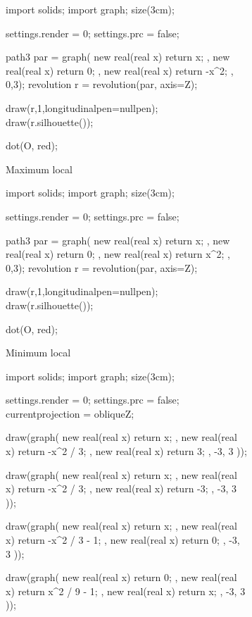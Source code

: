 \begin{figure}[H]
	\centering
	\begin{subfigure}{3cm}
		\centering
		\begin{asy}
			import solids;
			import graph;
			size(3cm);

			settings.render = 0;
			settings.prc = false;

			path3 par = graph(
				new real(real x) { return x; },
				new real(real x) { return 0; },
				new real(real x) { return -x^2; },
				0,3);
			revolution r = revolution(par, axis=Z);

			draw(r,1,longitudinalpen=nullpen);
			draw(r.silhouette());

			dot(O, red);
		\end{asy}
		\caption{Maximum local}
	\end{subfigure}
	\begin{subfigure}{3cm}
		\centering
		\begin{asy}
			import solids;
			import graph;
			size(3cm);

			settings.render = 0;
			settings.prc = false;

			path3 par = graph(
				new real(real x) { return x; },
				new real(real x) { return 0; },
				new real(real x) { return x^2; },
				0,3);
			revolution r = revolution(par, axis=Z);

			draw(r,1,longitudinalpen=nullpen);
			draw(r.silhouette());

			dot(O, red);
		\end{asy}
		\caption{Minimum local}
	\end{subfigure}
	\begin{subfigure}{3cm}
		\centering
		\begin{asy}
			import solids;
			import graph;
			size(3cm);

			settings.render = 0;
			settings.prc = false;
			currentprojection = obliqueZ;

			draw(graph(
				new real(real x) { return x; },
				new real(real x) { return -x^2 / 3; },
				new real(real x) { return 3; },
				-3, 3
			));

			draw(graph(
				new real(real x) { return x; },
				new real(real x) { return -x^2 / 3; },
				new real(real x) { return -3; },
				-3, 3
			));

			draw(graph(
				new real(real x) { return x; },
				new real(real x) { return -x^2 / 3 - 1; },
				new real(real x) { return 0; },
				-3, 3
			));

			draw(graph(
				new real(real x) { return 0; },
				new real(real x) { return x^2 / 9 - 1; },
				new real(real x) { return x; },
				-3, 3
			));


\end{asy}
\end{subfigure}
\end{figure}
